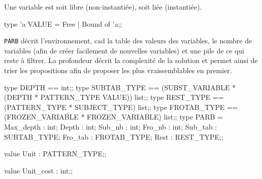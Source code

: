 Une variable est soit libre (non-instanti{\'e}e), soit li{\'e}e (instanti{\'e}e).

\begin{caml_code}
type 'a VALUE =
    Free
  | Bound of 'a;;
\end{caml_code}

\verb$PARB$ d{\'e}crit l'environnement, cad la table des valeurs des 
variables, le nombre de variables (afin de cr{\'e}er facilement de
nouvelles variables) et une pile de ce qui reste {\`a} filtrer. La
profondeur d{\'e}crit la complexit{\'e} de la solution et permet ainsi de
trier les propositions afin de proposer les plus vraissemblables en
premier.

\begin{caml_code}
type DEPTH == int;;
type SUBTAB_TYPE == (SUBST_VARIABLE * (DEPTH * PATTERN_TYPE VALUE)) list;;
type REST_TYPE == (PATTERN_TYPE * SUBJECT_TYPE) list;;
type FROTAB_TYPE == (FROZEN_VARIABLE * FROZEN_VARIABLE) list;;
type PARB = 
  {Max_depth : int;
   Depth : int;
   Sub_nb : int;
   Fro_nb : int;
   Sub_tab : SUBTAB_TYPE;
   Fro_tab : FROTAB_TYPE;
   Rest : REST_TYPE};;
\end{caml_code}

\begin{caml_hidden}
value Unit : PATTERN_TYPE;;

value Unit_cost : int;;
\end{caml_hidden}
